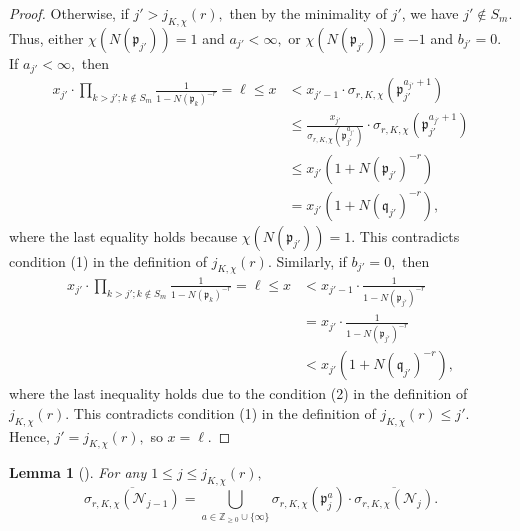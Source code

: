 \documentclass[12pt]{amsart}
\newtheorem{lemma}[theorem]{Lemma}
\theoremstyle{definition}
\numberwithin{equation}{section}
\newcommand{\p}{\mathfrak{p}}
\newcommand{\q}{\mathfrak{q}}
\newcommand{\Z}{\mathbb{Z}}
\begin{document}
\begin{proof}
    Otherwise, if $j' > j_{K,\chi}(r),$ then by the minimality of $j'$, we have $j' \not\in S_m.$ Thus, either $\chi(N(\p_{j'})) = 1$ and $a_{j'} < \infty,$ or $\chi(N(\p_{j'})) = -1$ and $b_{j'} = 0.$ 
    If $a_{j'} <\infty,$ then \begin{align*}
        x_{j'} \cdot \prod_{k > j'; k \not\in S_m} \frac{1}{1-N(\p_k)^{-r}} = \ell \leq x &< x_{j'-1} \cdot \sigma_{r,K,\chi}(\p_{j'}^{a_{j'} + 1}) \\
        &\leq \frac{x_{j'}}{\sigma_{r,K,\chi}(\p_{j'}^{a_{j'}})} \cdot  \sigma_{r,K,\chi}(\p_{j'}^{a_{j'} + 1}) \\
        &\leq x_{j'}  (1 + N(\p_{j'})^{-r})\\
        &= x_{j'}(1 + N(\q_{j'})^{-r}),
    \end{align*} where the last equality holds because $\chi(N(\p_{j'})) = 1.$ This contradicts condition (1) in the definition of $j_{K,\chi}(r).$ Similarly, if $b_{j'} = 0,$ then \begin{align*}
        x_{j'} \cdot \prod_{k > j'; k \not\in S_m} \frac{1}{1-N(\p_k)^{-r}} = \ell \leq x &< x_{j'-1} \cdot \frac{1}{1-N(\p_{j'})^{-r}} \\
        &= x_{j'} \cdot \frac{1}{1-N(\p_{j'})^{-r}} \\
        &< x_{j'} (1 + N(\q_{j'})^{-r}),
    \end{align*} where the last inequality holds due to the condition (2) in the definition of $j_{K,\chi}(r).$ This contradicts condition (1) in the definition of $j_{K,\chi}(r) \leq j'.$ Hence, $j' =j_{K,\chi}(r),$ so $x = \ell.$
\end{proof}





\begin{lemma} [{\cite[Lemma 2.4]{S17}}] \label{finiteness-induct}
    For any $1 \leq j \leq j_{K,\chi}(r),$  $$\overline{\sigma_{r,K,\chi}(\mathcal{N}_{j-1})} = \bigcup_{a \in \Z_{\geq 0} \cup \{\infty\}} \sigma_{r,K,\chi}(\p_j^a) \cdot \overline{\sigma_{r,K,\chi}(\mathcal{N}_j)}.$$
\end{lemma}
\end{document}
